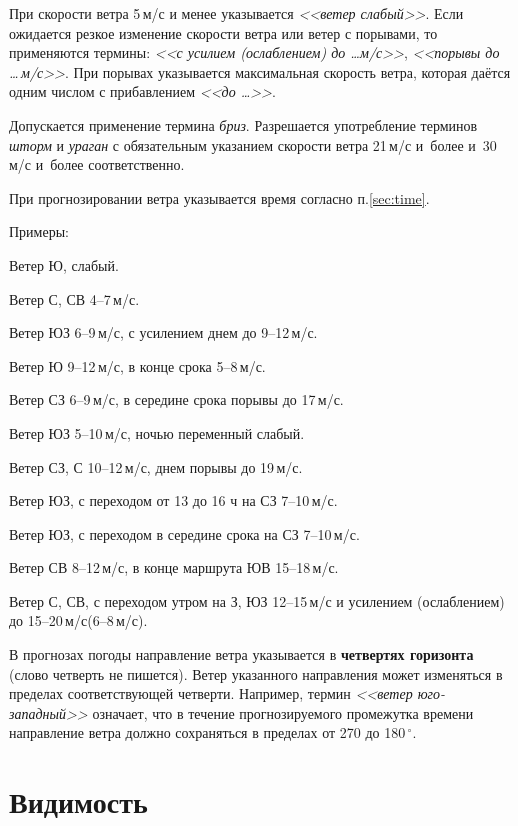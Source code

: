 \documentclass[a4paper, 12pt, twoside, draft, book, russian, fittopage, cyremdash, openright]{ncc}
\newcommand{\mps}{\,м/с\xspace}
\newcommand{\gr}{\ensuremath{\,^\circ}\xspace}
\begin{document}
При скорости ветра 5\mps и менее указывается \textit{<<ветер слабый>>}. Если
ожидается резкое изменение скорости ветра или ветер с порывами, то
применяются термины: \textit{<<с усилием (ослаблением) до \ldots м/с>>}, \textit{<<порывы до
\ldots\mps>>}. При порывах указывается максимальная скорость ветра, которая
даётся одним числом с прибавлением \textit{<<до \ldots>>}.

Допускается применение термина \textit{бриз}.  Разрешается употребление
терминов \textit{шторм} и \textit{ураган} с обязательным указанием скорости
ветра 21\mps и~более и~30\mps и~более соответственно.

При прогнозировании ветра указывается время согласно п.\ref{sec:time}.

Примеры:
\begin{list}{}{}
\item Ветер Ю, слабый.
\item Ветер С, СВ 4--7\mps.
\item Ветер ЮЗ 6--9\mps, с усилением днем до 9--12\mps.
\item Ветер Ю 9--12\mps, в конце срока 5--8\mps.
\item Ветер СЗ 6--9\mps, в середине срока порывы до 17\mps.
\item Ветер ЮЗ 5--10\mps, ночью переменный слабый.
\item Ветер СЗ, С 10--12\mps, днем порывы до 19\mps.
\item Ветер ЮЗ, с переходом от 13 до 16 ч на СЗ 7--10\mps.
\item Ветер ЮЗ, с переходом в середине срока на СЗ 7--10\mps.
\item Ветер СВ 8--12\mps, в конце маршрута ЮВ 15--18\mps.
\item Ветер С, СВ, с переходом утром на З, ЮЗ 12--15\mps и усилением (ослаблением) до 15--20\mps (6--8\mps).
\end{list}

В прогнозах погоды направление ветра указывается в \textbf{четвертях
  горизонта} (слово четверть не пишется). Ветер указанного направления
может изменяться в пределах соответствующей четверти. Например, термин
\textit{<<ветер юго-западный>>} означает, что в течение
прогнозируемого промежутка времени направление ветра должно
сохраняться в пределах от 270 до 180\gr.

\section{Видимость}
\label{sec:visibility}
\end{document}
